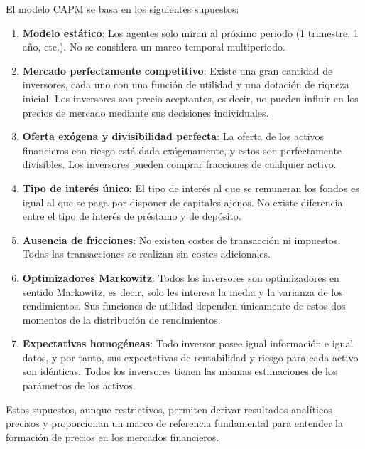 \begin{teorema}
El modelo CAPM se basa en los siguientes supuestos:

\begin{enumerate}
\item \textbf{Modelo estático}: Los agentes solo miran al próximo periodo (1 trimestre, 1 año, etc.). No se considera un marco temporal multiperiodo.

\item \textbf{Mercado perfectamente competitivo}: Existe una gran cantidad de inversores, cada uno con una función de utilidad y una dotación de riqueza inicial. Los inversores son precio-aceptantes, es decir, no pueden influir en los precios de mercado mediante sus decisiones individuales.

\item \textbf{Oferta exógena y divisibilidad perfecta}: La oferta de los activos financieros con riesgo está dada exógenamente, y estos son perfectamente divisibles. Los inversores pueden comprar fracciones de cualquier activo.

\item \textbf{Tipo de interés único}: El tipo de interés al que se remuneran los fondos es igual al que se paga por disponer de capitales ajenos. No existe diferencia entre el tipo de interés de préstamo y de depósito.

\item \textbf{Ausencia de fricciones}: No existen costes de transacción ni impuestos. Todas las transacciones se realizan sin costes adicionales.

\item \textbf{Optimizadores Markowitz}: Todos los inversores son optimizadores en sentido Markowitz, es decir, solo les interesa la media y la varianza de los rendimientos. Sus funciones de utilidad dependen únicamente de estos dos momentos de la distribución de rendimientos.

\item \textbf{Expectativas homogéneas}: Todo inversor posee igual información e igual datos, y por tanto, sus expectativas de rentabilidad y riesgo para cada activo son idénticas. Todos los inversores tienen las mismas estimaciones de los parámetros de los activos.
\end{enumerate}
\end{teorema}

Estos supuestos, aunque restrictivos, permiten derivar resultados analíticos precisos y proporcionan un marco de referencia fundamental para entender la formación de precios en los mercados financieros.

